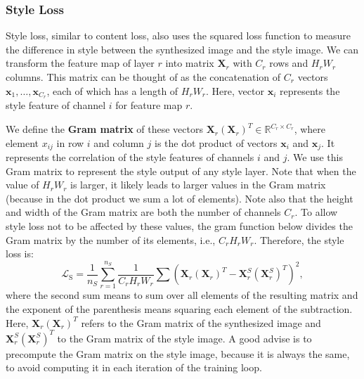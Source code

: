 \subsubsection{Style Loss}

Style loss, similar to content loss, also uses the squared loss function to measure the difference in style between the synthesized image and the style image. We can transform the feature map of layer $r$ into matrix $\mathbf{X}_r$ with $C_r$ rows and $H_rW_r$ columns. This matrix can be thought of as the concatenation of $C_r$ vectors $\mathbf{x}_1, \ldots, \mathbf{x}_{C_r}$, each of which has a length of $H_rW_r$. Here, vector $\mathbf{x}_i$ represents the style feature of channel $i$ for feature map $r$.

We define the \textbf{Gram matrix} of these vectors $\mathbf{X}_r\left(\mathbf{X}_r\right)^T\in\mathbb{R}^{C_r\times C_r}$, where element $x_{ij}$ in row $i$ and column $j$ is the dot product of vectors $\mathbf{x}_i$ and $\mathbf{x}_j$. It represents the correlation of the style features of channels $i$ and $j$. We use this Gram matrix to represent the style output of any style layer. Note that when the value of $H_rW_r$ is larger, it likely leads to larger values in the Gram matrix (because in the dot product we sum a lot of elements). Note also that the height and width of the Gram matrix are both the number of channels $C_r$. To allow style loss not to be affected by these values, the gram function below divides the Gram matrix by the number of its elements, i.e., $C_rH_rW_r$. Therefore, the style loss is:
$$\mathcal{L}_\text{S} = \dfrac{1}{n_S} \sum_{r=1}^{n_S}\dfrac{1}{C_rH_rW_r}\sum\left(\mathbf{X}_r\left(\mathbf{X}_r\right)^T-\mathbf{X}_r^S\left(\mathbf{X}_r^S\right)^T\right)^2,$$
where the second sum means to sum over all elements of the resulting matrix and the exponent of the parenthesis means squaring each element of the subtraction. Here, $\mathbf{X}_r\left(\mathbf{X}_r\right)^T$ refers to the Gram matrix of the synthesized image and $\mathbf{X}_r^S\left(\mathbf{X}_r^S\right)^T$ to the Gram matrix of the style image. A good advise is to precompute the Gram matrix on the style image, because it is always the same, to avoid computing it in each iteration of the training loop.


